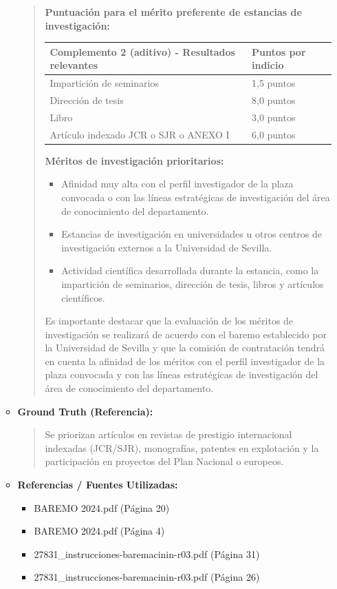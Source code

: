 \documentclass[12pt,a4paper,oneside]{report}
\begin{document}
\begin{itemize}
\begin{itemize}
\begin{quote}
\textbf{Puntuación para el mérito preferente de estancias de investigación:}


\begin{tabular}{p{3.5cm} p{8cm}}
\toprule
\textbf{Complemento 2 (aditivo) - Resultados relevantes} & \textbf{Puntos por indicio} \\
\midrule
Impartición de seminarios & 1,5 puntos \\
Dirección de tesis & 8,0 puntos \\
Libro & 3,0 puntos \\
Artículo indexado JCR o SJR o ANEXO I & 6,0 puntos \\
\bottomrule
\end{tabular}


\textbf{Méritos de investigación prioritarios:}

\begin{itemize}
  \item Afinidad muy alta con el perfil investigador de la plaza convocada o con las líneas estratégicas de investigación del área de conocimiento del departamento.
  \item Estancias de investigación en universidades u otros centros de investigación externos a la Universidad de Sevilla.
  \item Actividad científica desarrollada durante la estancia, como la impartición de seminarios, dirección de tesis, libros y artículos científicos.
\end{itemize}

Es importante destacar que la evaluación de los méritos de investigación se realizará de acuerdo con el baremo establecido por la Universidad de Sevilla y que la comisión de contratación tendrá en cuenta la afinidad de los méritos con el perfil investigador de la plaza convocada y con las líneas estratégicas de investigación del área de conocimiento del departamento.
                \end{quote}
          \item \textbf{{Ground Truth (Referencia):}} \\
                \begin{quote}
Se priorizan artículos en revistas de prestigio internacional indexadas (JCR/SJR), monografías, patentes en explotación y la participación en proyectos del Plan Nacional o europeos.
                \end{quote}
          \item \textbf{{Referencias / Fuentes Utilizadas:}} \\
                \begin{itemize}
                  \item BAREMO 2024.pdf (Página 20)
                  \item BAREMO 2024.pdf (Página 4)
                  \item 27831\_instrucciones-baremacinin-r03.pdf (Página 31)
                  \item 27831\_instrucciones-baremacinin-r03.pdf (Página 26)
                \end{itemize}
        \end{itemize}


\end{itemize}
\end{document}
